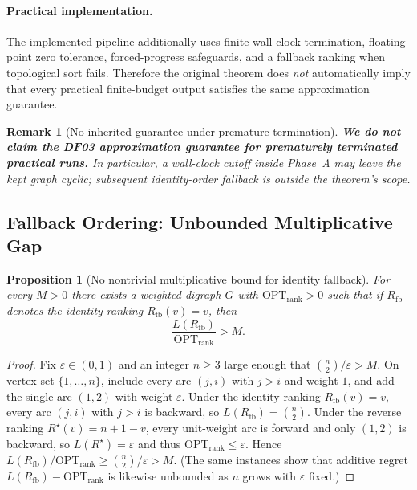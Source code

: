 \documentclass{article}
\newtheorem{proposition}{Proposition}
\newtheorem{remark}{Remark}
\begin{document}
\paragraph{Practical implementation.}
The implemented pipeline additionally uses finite wall-clock termination, floating-point zero tolerance, forced-progress safeguards, and a fallback ranking when topological sort fails. Therefore the original theorem does \emph{not} automatically imply that every practical finite-budget output satisfies the same approximation guarantee.

\begin{remark}[No inherited guarantee under premature termination]
\label{rem:no_df03_timeout}
\textbf{We do not claim the DF03 approximation guarantee for prematurely terminated practical runs.}
In particular, a wall-clock cutoff inside Phase~A may leave the kept graph cyclic; subsequent identity-order fallback is outside the theorem's scope.
\end{remark}

\subsection{Fallback Ordering: Unbounded Multiplicative Gap}
\label{subsec:theory_fallback}

\begin{proposition}[No nontrivial multiplicative bound for identity fallback]
\label{prop:fallback}
For every $M>0$ there exists a weighted digraph $G$ with $\mathrm{OPT}_{\mathrm{rank}}>0$ such that if $R_{\mathrm{fb}}$ denotes the identity ranking $R_{\mathrm{fb}}(v)=v$, then
\[
\frac{L(R_{\mathrm{fb}})}{\mathrm{OPT}_{\mathrm{rank}}}>M.
\]
\end{proposition}

\begin{proof}
Fix $\varepsilon\in(0,1)$ and an integer $n\ge 3$ large enough that $\binom{n}{2}/\varepsilon>M$.
On vertex set $\{1,\dots,n\}$, include every arc $(j,i)$ with $j>i$ and weight $1$, and add the single arc $(1,2)$ with weight $\varepsilon$.
Under the identity ranking $R_{\mathrm{fb}}(v)=v$, every arc $(j,i)$ with $j>i$ is backward, so $L(R_{\mathrm{fb}})=\binom{n}{2}$.
Under the reverse ranking $R^\star(v)=n+1-v$, every unit-weight arc is forward and only $(1,2)$ is backward, so $L(R^\star)=\varepsilon$ and thus $\mathrm{OPT}_{\mathrm{rank}}\le\varepsilon$.
Hence $L(R_{\mathrm{fb}})/\mathrm{OPT}_{\mathrm{rank}}\ge\binom{n}{2}/\varepsilon>M$.
(The same instances show that additive regret $L(R_{\mathrm{fb}})-\mathrm{OPT}_{\mathrm{rank}}$ is likewise unbounded as $n$ grows with $\varepsilon$ fixed.)
\end{proof}
\end{document}
